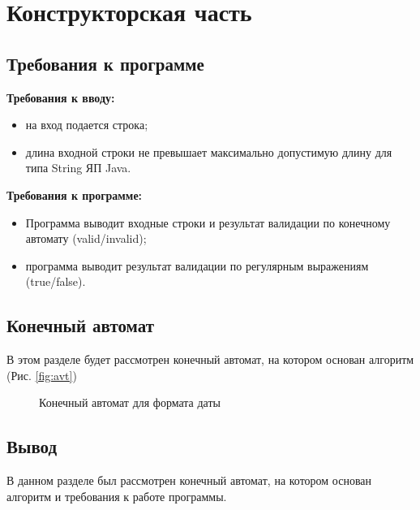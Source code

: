 \documentclass[12pt]{report}
\begin{document}
\chapter{Конструкторская часть}
\section{Требования к программе}
\textbf{Требования к вводу:}
\begin{itemize}
	\item на вход подается строка;
	\item длина входной строки не превышает максимально допустимую длину для типа String ЯП Java.
\end{itemize}
\textbf{Требования к программе:}
\begin{itemize}
	\item Программа выводит входные строки и результат валидации по конечному автомату (valid/invalid);
	\item программа выводит результат валидации по регулярным выражениям (true/false).
\end{itemize}

\section{Конечный автомат}
В этом разделе будет рассмотрен конечный автомат, на котором основан алгоритм (Рис. \ref{fig:avt})

\begin{figure}[h]
	\caption{Конечный автомат для формата даты}
	\label{ris:example}
\end{figure}

\section{Вывод}
В данном разделе был рассмотрен конечный автомат, на котором основан алгоритм и требования к работе программы.
\end{document}
